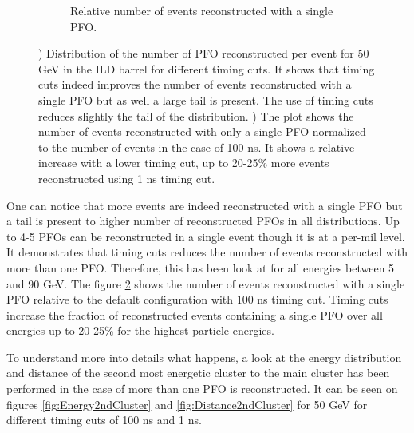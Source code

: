 \begin{figure}[htbp!]
\begin{subfigure}[t]{0.49\textwidth}
    \caption{Relative number of events reconstructed with a single PFO.} \label{fig:EventRecoPFO}
  \end{subfigure}
  \caption{) Distribution of the number of PFO reconstructed per event for 50 GeV \kzeroL{} in the ILD barrel for different timing cuts. It shows that timing cuts indeed improves the number of events reconstructed with a single PFO but as well a large tail is present. The use of timing cuts reduces slightly the tail of the distribution. ) The plot shows the number of events reconstructed with only a single PFO normalized to the number of events in the case of 100 ns. It shows a relative increase with a lower timing cut, up to 20-25\% more events reconstructed using 1 ns timing cut.}
\end{figure}

One can notice that more events are indeed reconstructed with a single PFO but a tail is present to higher number of reconstructed PFOs in all distributions. Up to 4-5 PFOs can be reconstructed in a single event though it is at a per-mil level. It demonstrates that timing cuts reduces the number of events reconstructed with more than one PFO. Therefore, this has been look at for all energies between 5 and 90 GeV. The figure \ref{fig:EventRecoPFO} shows the number of events reconstructed with a single PFO relative to the default configuration with 100 ns timing cut. Timing cuts increase the fraction of reconstructed events containing a single PFO over all energies up to 20-25\% for the highest particle energies.

To understand more into details what happens, a look at the energy distribution and distance of the second most energetic cluster to the main cluster has been performed in the case of more than one PFO is reconstructed. It can be seen on figures \ref{fig:Energy2ndCluster} and \ref{fig:Distance2ndCluster} for 50 GeV \kzeroL{} for different timing cuts of 100 ns and 1 ns.

